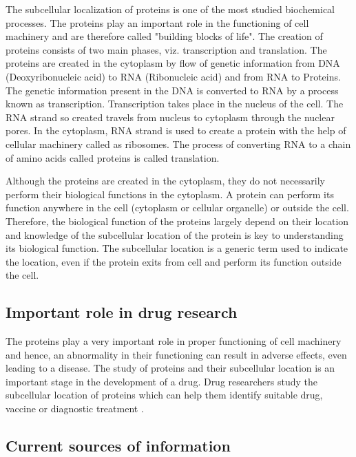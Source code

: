 The subcellular localization of proteins is one of the most studied biochemical processes. The proteins play an important role in the functioning of cell machinery and are therefore called "building blocks of life". The creation of proteins consists of two main phases, viz. transcription and translation. The proteins are created in the cytoplasm by flow of genetic information from DNA (Deoxyribonucleic acid) to RNA (Ribonucleic acid) and from RNA to Proteins. The genetic information present in the DNA is converted to RNA by a process known as transcription. Transcription takes place in the nucleus of the cell. The RNA strand so created travels from nucleus to cytoplasm through the nuclear pores. In the cytoplasm, RNA strand is used to create a protein with the help of cellular machinery called as ribosomes. The process of converting RNA to a chain of amino acids called proteins is called translation. 

Although the proteins are created in the cytoplasm, they do not necessarily perform their biological functions in the cytoplasm. A protein can perform its function anywhere in the cell (cytoplasm or cellular organelle) or outside the  cell. Therefore, the biological function of the proteins largely depend on their location and knowledge of the subcellular location of the protein is key to understanding its biological function. The subcellular location is a generic term used to indicate the location, even if the protein exits from cell and perform its  function outside the cell.

\subsection*{Important role in drug research}

The proteins play a very important role in proper functioning of cell machinery and hence, an abnormality in their functioning can result in adverse effects, even leading to a disease. The study of proteins and their subcellular location is an important stage in the development of a drug. Drug researchers study the subcellular location of proteins which can help them identify suitable drug, vaccine or diagnostic treatment \cite{liu2007exploiting}. 


\subsection*{Current sources of information}

